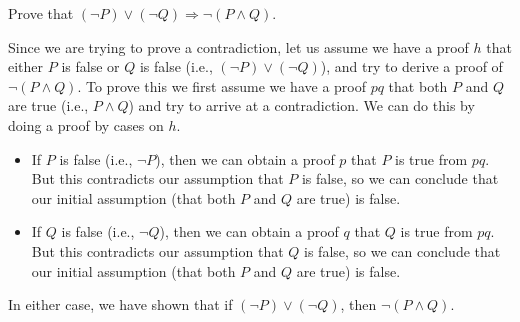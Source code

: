 \begin{Exercise}
Prove that $(\neg P) \vee (\neg Q) \Rightarrow \neg (P \wedge Q)$.
\end{Exercise} 
\begin{Answer}

Since we are trying to prove a contradiction, let us assume we have a proof $h$ that either $P$ is false or $Q$ is false (i.e., $(\neg P) \vee (\neg Q)$), and try to derive a proof of $\neg( P \wedge Q)$. To prove this we first assume we have a proof $pq$ that both $P$ and $Q$ are true (i.e., $P \wedge Q$) and try to arrive at a contradiction. We can do this by doing a proof by cases on $h$.

\begin{itemize}
\item If $P$ is false (i.e., $\neg P$), then we can obtain a proof $p$ that $P$ is true from $pq$. But this contradicts our assumption that $P$ is false, so we can conclude that our initial assumption (that both $P$ and $Q$ are true) is false.
\item If $Q$ is false (i.e., $\neg Q$), then we can obtain a proof $q$ that $Q$ is true from $pq$. But this contradicts our assumption that $Q$ is false, so we can conclude that our initial assumption (that both $P$ and $Q$ are true) is false.
\end{itemize} 

In either case, we have shown that if $(\neg P) \vee (\neg Q)$, then $\neg (P \wedge Q)$.
\end{Answer}
